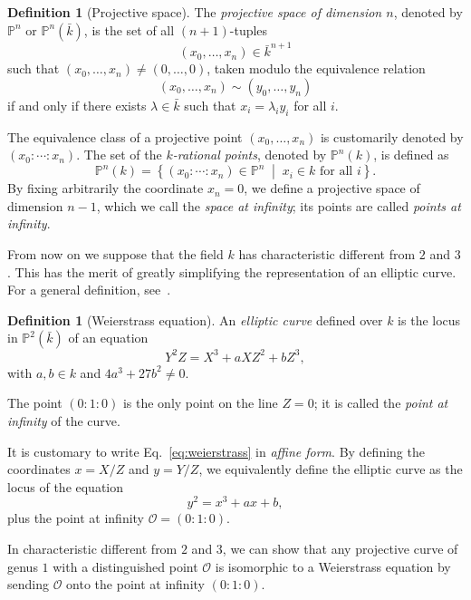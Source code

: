 \documentclass[10pt]{article}
\theoremstyle{plain}
\theoremstyle{definition}
\newtheorem{definition}[theorem]{Definition}
\def\P{\ensuremath{\mathbb{P}}}
\def\O{\ensuremath{\mathcal{O}}}
\begin{document}
\begin{definition}[Projective space]
  The \emph{projective space of dimension $n$}, denoted by $\P^n$ or
  $\P^n(\bar{k})$, is the set of all $(n+1)$-tuples
  \[(x_0,\dots,x_n) ∈ \bar{k}^{n+1}\] %
  such that $(x_0,\dots,x_n) ≠ (0,\dots,0)$, taken modulo the
  equivalence relation
  \[(x_0,\dots,x_n) \sim (y_0,\dots,y_n)\] %
  if and only if there exists $λ\in\bar{k}$ such that
  $x_i=λ_iy_i$ for all $i$.
\end{definition}

The equivalence class of a projective point $(x_0,\dots,x_n)$ is
customarily denoted by $(x_0:\cdots:x_n)$. %
The set of the \emph{$k$-rational points}, denoted by $\P^n(k)$, is
defined as
\[\P^n(k) = \left\{(x_0:\cdots:x_n)∈\P^n\;\middle|\; x_i ∈ k \text{ for all $i$}\right\}.\] %
By fixing arbitrarily the coordinate $x_n=0$, we define a projective
space of dimension $n-1$, which we call the \emph{space at infinity};
its points are called \emph{points at infinity}.

From now on we suppose that the field $k$ has characteristic different
from $2$ and $3$. %
This has the merit of greatly simplifying the representation of an
elliptic curve. %
For a general definition, see~\cite[Chap.~III]{silverman:elliptic}.

\begin{definition}[Weierstrass equation]
  An \emph{elliptic curve} defined over $k$ is the locus in
  $\P^2(\bar{k})$ of an equation
  \begin{equation}
    \label{eq:weierstrass}
    Y^2Z = X^3 + aXZ^2 + bZ^3,    
  \end{equation}
  with $a,b∈k$ and $4a^3+27b^2\ne0$.

  The point $(0:1:0)$ is the only point on the line $Z=0$; it is
  called the \emph{point at infinity} of the curve.
\end{definition}

It is customary to write Eq.~\eqref{eq:weierstrass} in \emph{affine
  form}. %
By defining the coordinates $x=X/Z$ and $y=Y/Z$, we equivalently
define the elliptic curve as the locus of the equation
\[y^2 = x^3 + ax +b,\]
plus the point at infinity $\O=(0:1:0)$.

In characteristic different from $2$ and $3$, we can show that any
projective curve of genus $1$ with a distinguished point $\O$ is
isomorphic to a Weierstrass equation by sending $\O$ onto the point at
infinity $(0:1:0)$.
\end{document}
